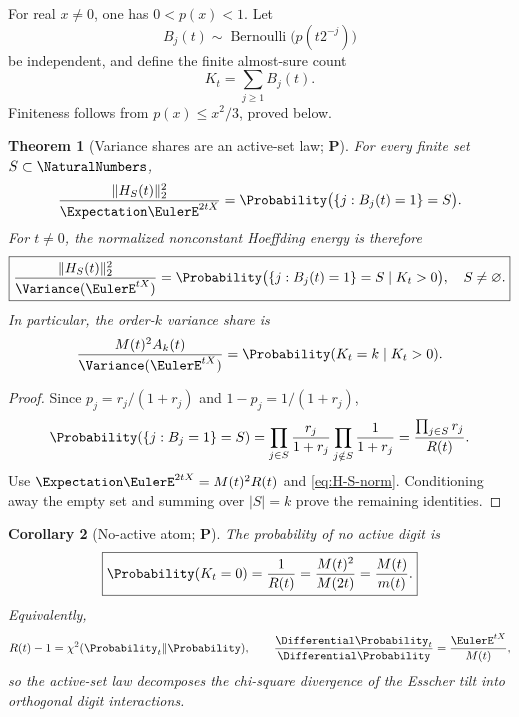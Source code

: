 \documentclass[11pt,oneside]{article}
\newtheorem{theorem}{Theorem}[section]
\newtheorem{corollary}[theorem]{Corollary}
\theoremstyle{definition}
\theoremstyle{remark}
\newcommand{\statusP}{\textcolor{deepgreen}{\textbf{P}}}
\begin{document}
For real $x\ne0$, one has $0<p(x)<1$.  Let
\begin{equation}
 B_j(t)\sim\operatorname{Bernoulli}\bigl(p(t2^{-j})\bigr)
 \label{eq:B-j}
\end{equation}
be independent, and define the finite almost-sure count
\begin{equation}
 K_t=\sum_{j\ge1}B_j(t).
 \label{eq:K-t}
\end{equation}
Finiteness follows from $p(x)\le x^2/3$, proved below.

\begin{theorem}[Variance shares are an active-set law; \statusP]
\label{thm:active-set-law}
For every finite set $S\subset\NaturalNumbers$,
\begin{equation}
 \frac{\|H_S(t)\|_2^2}{\Expectation\EulerE^{2tX}}
 =\Probability\bigl(\{j:B_j(t)=1\}=S\bigr).
 \label{eq:energy-active-set}
\end{equation}
For $t\ne0$, the normalized nonconstant Hoeffding energy is therefore
\begin{equation}
 \boxed{
 \frac{\|H_S(t)\|_2^2}{\Variance(\EulerE^{tX})}
 =\Probability\bigl(\{j:B_j(t)=1\}=S\mid K_t>0\bigr),
 \quad S\ne\varnothing.}
 \label{eq:variance-active-conditioned}
\end{equation}
In particular, the order-$k$ variance share is
\begin{equation}
 \frac{M(t)^2A_k(t)}{\Variance(\EulerE^{tX})}
 =\Probability(K_t=k\mid K_t>0).
 \label{eq:order-law}
\end{equation}
\end{theorem}

\begin{proof}
Since $p_j=r_j/(1+r_j)$ and $1-p_j=1/(1+r_j)$,
\[
 \Probability(\{j:B_j=1\}=S)
 =\prod_{j\in S}\frac{r_j}{1+r_j}
  \prod_{j\notin S}\frac1{1+r_j}
 =\frac{\prod_{j\in S}r_j}{R(t)}.
\]
Use $\Expectation\EulerE^{2tX}=M(t)^2R(t)$ and \eqref{eq:H-S-norm}.  Conditioning away the
empty set and summing over $|S|=k$ prove the remaining identities.
\end{proof}

\begin{corollary}[No-active atom; \statusP]
\label{cor:no-active}
The probability of no active digit is
\begin{equation}
 \boxed{
 \Probability(K_t=0)=\frac1{R(t)}
 =\frac{M(t)^2}{M(2t)}
 =\frac{M(t)}{m(t)}.}
 \label{eq:P0}
\end{equation}
Equivalently,
\begin{equation}
 R(t)-1=\chi^2(\Probability_t\|\Probability),
 \qquad
 \frac{\Differential\Probability_t}{\Differential\Probability}=\frac{\EulerE^{tX}}{M(t)},
 \label{eq:chi-square}
\end{equation}
so the active-set law decomposes the chi-square divergence of the Esscher tilt
into orthogonal digit interactions.
\end{corollary}
\end{document}
